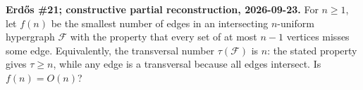 \textbf{Erd\H{o}s \#21; constructive partial reconstruction, 2026-09-23.}
For $n\ge1$, let $f(n)$ be the smallest number of edges in an intersecting $n$-uniform hypergraph $\mathcal F$ with the property that every set of at most $n-1$ vertices misses some edge. Equivalently, the transversal number $\tau(\mathcal F)$ is $n$: the stated property gives $\tau\ge n$, while any edge is a transversal because all edges intersect. Is $f(n)=O(n)$?

